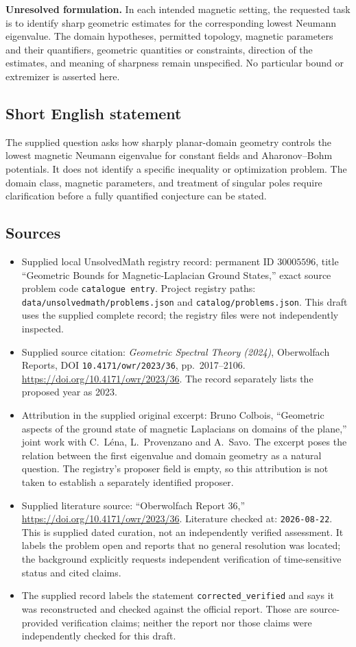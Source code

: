\documentclass[11pt]{article}
\begin{document}
\textbf{Unresolved formulation.} In each intended magnetic setting, the requested task is to identify sharp geometric estimates for the corresponding lowest Neumann eigenvalue. The domain hypotheses, permitted topology, magnetic parameters and their quantifiers, geometric quantities or constraints, direction of the estimates, and meaning of sharpness remain unspecified. No particular bound or extremizer is asserted here.
\subsection{Short English statement}
The supplied question asks how sharply planar-domain geometry controls the lowest magnetic Neumann eigenvalue for constant fields and Aharonov--Bohm potentials. It does not identify a specific inequality or optimization problem. The domain class, magnetic parameters, and treatment of singular poles require clarification before a fully quantified conjecture can be stated.
\subsection{Sources}
\begin{itemize}
\item Supplied local UnsolvedMath registry record: permanent ID \(30005596\), title ``Geometric Bounds for Magnetic-Laplacian Ground States,'' exact source problem code \texttt{catalogue entry}. Project registry paths: \texttt{data/unsolvedmath/problems.json} and \texttt{catalog/problems.json}. This draft uses the supplied complete record; the registry files were not independently inspected.
\item Supplied source citation: \emph{Geometric Spectral Theory (2024)}, Oberwolfach Reports, DOI \texttt{10.4171/owr/2023/36}, pp.~2017--2106. \url{https://doi.org/10.4171/owr/2023/36}. The record separately lists the proposed year as 2023.
\item Attribution in the supplied original excerpt: Bruno Colbois, ``Geometric aspects of the ground state of magnetic Laplacians on domains of the plane,'' joint work with C.~L\'ena, L.~Provenzano and A.~Savo. The excerpt poses the relation between the first eigenvalue and domain geometry as a natural question. The registry's proposer field is empty, so this attribution is not taken to establish a separately identified proposer.
\item Supplied literature source: ``Oberwolfach Report 36,'' \url{https://doi.org/10.4171/owr/2023/36}. Literature checked at: \texttt{2026-08-22}. This is supplied dated curation, not an independently verified assessment. It labels the problem open and reports that no general resolution was located; the background explicitly requests independent verification of time-sensitive status and cited claims.
\item The supplied record labels the statement \texttt{corrected\_verified} and says it was reconstructed and checked against the official report. Those are source-provided verification claims; neither the report nor those claims were independently checked for this draft.
\end{itemize}
\end{document}
